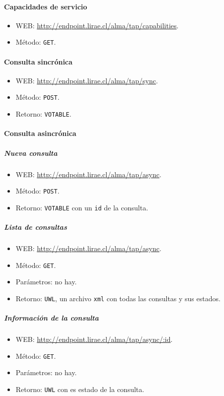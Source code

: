 \paragraph{Capacidades de servicio}

\begin{itemize}
	\item WEB: \url{http://endpoint.lirae.cl/alma/tap/capabilities}.
	\item M\'etodo: \verb;GET;.
\end{itemize}

\paragraph{Consulta sincrónica}

\begin{itemize}
	\item WEB: \url{http://endpoint.lirae.cl/alma/tap/sync}.
	\item M\'etodo: \verb;POST;.
	\item Retorno: \verb;VOTABLE;.
\end{itemize}

\paragraph{Consulta asincrónica}

\subparagraph{Nueva consulta}

\begin{itemize}
	\item WEB: \url{http://endpoint.lirae.cl/alma/tap/async}.
	\item M\'etodo: \verb;POST;.
	\item Retorno: \verb;VOTABLE; con un \verb;id; de la consulta.
\end{itemize}

\subparagraph{Lista de consultas}

\begin{itemize}
	\item WEB: \url{http://endpoint.lirae.cl/alma/tap/async}.
	\item M\'etodo: \verb;GET;.
	\item Parámetros: no hay.
	\item Retorno: \verb;UWL;, un archivo \verb;xml; con todas las consultas y sus estados.
\end{itemize}

\subparagraph{Información de la consulta}

\begin{itemize}
	\item WEB: \url{http://endpoint.lirae.cl/alma/tap/async/:id}.
	\item M\'etodo: \verb;GET;.
	\item Parámetros: no hay.
	\item Retorno: \verb;UWL; con es estado de la consulta.
\end{itemize}

